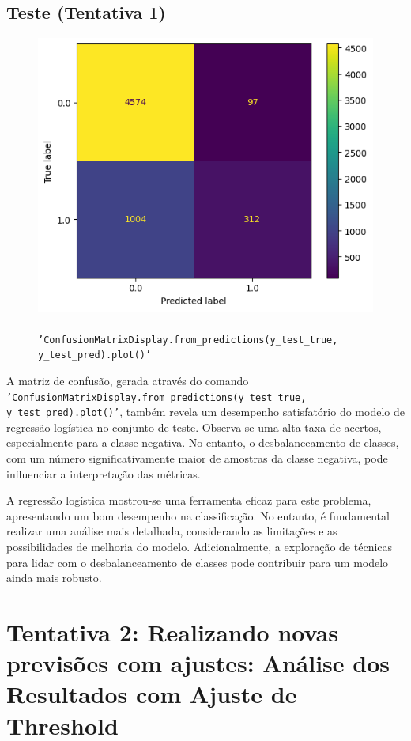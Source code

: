 \documentclass{abntpuc}
\begin{document}
\subsection*{\centering\Large\textbf{Teste (Tentativa 1)}}
\begin{figure}[H]
    \centering
    \includegraphics[width=\textwidth]{grafico6.png}
    \caption{\\ \texttt{'ConfusionMatrixDisplay.from\_predictions(y\_test\_true, y\_test\_pred).plot()'}}
    \label{fig:grafico6}
    \centering
\end{figure}

A matriz de confusão, gerada através do comando \texttt{'ConfusionMatrixDisplay.from\_predictions(y\_test\_true, y\_test\_pred).plot()'}, também revela um desempenho satisfatório do modelo de regressão logística no conjunto de teste. Observa-se uma alta taxa de acertos, especialmente para a classe negativa. No entanto, o desbalanceamento de classes, com um número significativamente maior de amostras da classe negativa, pode influenciar a interpretação das métricas.

A regressão logística mostrou-se uma ferramenta eficaz para este problema, apresentando um bom desempenho na classificação. No entanto, é fundamental realizar uma análise mais detalhada, considerando as limitações e as possibilidades de melhoria do modelo. Adicionalmente, a exploração de técnicas para lidar com o desbalanceamento de classes pode contribuir para um modelo ainda mais robusto.

\section{Tentativa 2: Realizando novas previsões com ajustes: Análise dos Resultados com Ajuste de Threshold}
\end{document}
